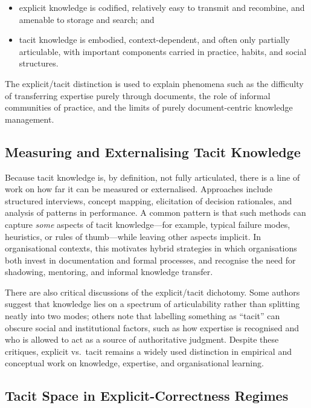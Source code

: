 \begin{itemize}
  \item explicit knowledge is codified, relatively easy to transmit and recombine, and amenable to storage and search; and
  \item tacit knowledge is embodied, context-dependent, and often only partially articulable, with important components carried in practice, habits, and social structures.
\end{itemize}

The explicit/tacit distinction is used to explain phenomena such as the difficulty of transferring expertise purely through documents, the role of informal communities of practice, and the limits of purely document-centric knowledge management.

\subsection{Measuring and Externalising Tacit Knowledge}

Because tacit knowledge is, by definition, not fully articulated, there is a line of work on how far it can be measured or externalised. Approaches include structured interviews, concept mapping, elicitation of decision rationales, and analysis of patterns in performance. A common pattern is that such methods can capture \emph{some} aspects of tacit knowledge---for example, typical failure modes, heuristics, or rules of thumb—while leaving other aspects implicit. In organisational contexts, this motivates hybrid strategies in which organisations both invest in documentation and formal processes, and recognise the need for shadowing, mentoring, and informal knowledge transfer.

There are also critical discussions of the explicit/tacit dichotomy. Some authors suggest that knowledge lies on a spectrum of articulability rather than splitting neatly into two modes; others note that labelling something as ``tacit'' can obscure social and institutional factors, such as how expertise is recognised and who is allowed to act as a source of authoritative judgment. Despite these critiques, explicit vs.\ tacit remains a widely used distinction in empirical and conceptual work on knowledge, expertise, and organisational learning.
\subsection{Tacit Space in Explicit-Correctness Regimes}


